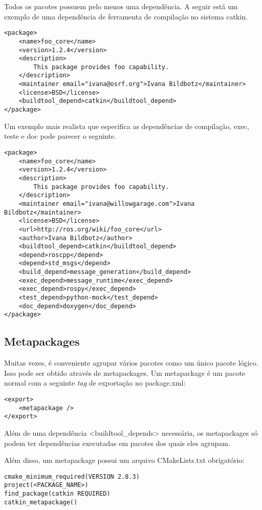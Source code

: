 Todos os pacotes possuem pelo menos uma dependência. A seguir está um exemplo de uma dependência de ferramenta de compilação no sistema catkin.

\begin{verbatim}
<package>
	<name>foo_core</name>
	<version>1.2.4</version>
	<description>
		This package provides foo capability.
	</description>
	<maintainer email="ivana@osrf.org">Ivana Bildbotz</maintainer>
	<license>BSD</license>
	<buildtool_depend>catkin</buildtool_depend>
</package>
\end{verbatim}

Um exemplo mais realista que especifica as dependências de compilação, exec, teste e doc pode parecer o seguinte.

\begin{verbatim}
<package>
	<name>foo_core</name>
	<version>1.2.4</version>
	<description>
		This package provides foo capability.
	</description>
	<maintainer email="ivana@willowgarage.com">Ivana Bildbotz</maintainer>
	<license>BSD</license>
	<url>http://ros.org/wiki/foo_core</url>
	<author>Ivana Bildbotz</author>
	<buildtool_depend>catkin</buildtool_depend>
	<depend>roscpp</depend>
	<depend>std_msgs</depend>
	<build_depend>message_generation</build_depend>
	<exec_depend>message_runtime</exec_depend>
	<exec_depend>rospy</exec_depend>
	<test_depend>python-mock</test_depend>
	<doc_depend>doxygen</doc_depend>
</package>
\end{verbatim}


\subsection{Metapackages}


Muitas vezes, é conveniente agrupar vários pacotes como um único pacote lógico. Isso pode ser obtido através de metapackages. Um metapackage é um pacote normal com a seguinte \textit{tag} de exportação no package.xml:

\begin{verbatim}
<export>
	<metapackage />
</export>
\end{verbatim}


Além de uma dependência <buildtool\_depends> necessária, os metapackages só podem ter dependências executadas em pacotes dos quais eles agrupam.

Além disso, um metapackage possui um arquivo CMakeLists.txt obrigatório:

\begin{verbatim}
cmake_minimum_required(VERSION 2.8.3)
project(<PACKAGE_NAME>)
find_package(catkin REQUIRED)
catkin_metapackage()\end{verbatim}

